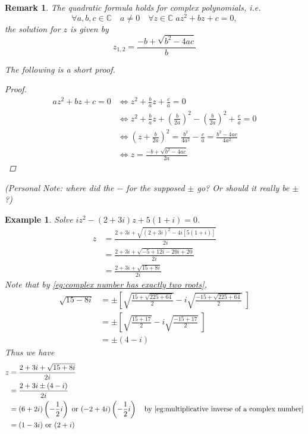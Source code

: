 \documentclass[11pt, oneside]{book}
\theoremstyle{break}
\newtheorem*{proof}{Proof}
\newtheorem*{remark}{Remark}
\newtheorem{eg}{Example}[section]
\begin{document}
\begin{remark}\label{remark:quadratic formula for complex numbers}
	The quadratic formula holds for complex polynomials, i.e.
	\begin{equation*}
		\forall a, b, c \in \mathbb{C} \quad a \neq 0 \quad \forall z \in \mathbb{C} \; az^2 + bz + c = 0,
	\end{equation*}
	the solution for $z$ is given by
	\begin{equation}\label{eq:quadractic formula for complex numbers}
		z_{1, 2} = \frac{-b + \sqrt{b^2 - 4ac}}{b} 
	\end{equation}

	The following is a short proof.

	\begin{proof}
		\begin{align*}
			az^2 + bz + c = 0 &\iff z^2 + \frac{b}{a} z + \frac{c}{a} = 0 \\
				&\iff z^2 + \frac{b}{a} z + \left(\frac{b}{2a} \right)^2 - \left(\frac{b}{2a}\right)^2 + \frac{c}{a} = 0 \\
				&\iff \left(z + \frac{b}{2a} \right)^2 = \frac{b^2}{4a^2} - \frac{c}{a} = \frac{b^2 - 4ac}{4a^2} \\
				&\iff z = \frac{-b + \sqrt{b^2 - 4ac}}{2a}  
		\end{align*}
	\end{proof}

	(Personal Note: where did the $-$ for the supposed $\pm$ go? Or should it really be $\pm$?)
\end{remark}

\begin{eg}
	Solve $iz^2 - (2 + 3i)z + 5(1 + i) = 0$.
	\begin{align*}
		z &= \frac{2 + 3i + \sqrt{(2 + 3i)^2 - 4i[5(1 + i)]}}{2i} \\
			&= \frac{2 + 3i + \sqrt{-5 + 12i -20i + 20}}{2i} \\
			&= \frac{2 + 3i + \sqrt{15 + 8i}}{2i} 
	\end{align*}
	Note that by \cref{eg:complex number has exactly two roots},
	\begin{align*}
		\sqrt{15 - 8i} &= \pm \left[ \sqrt{\frac{15 + \sqrt{225 + 64}}{2} } - i \sqrt{\frac{-15 + \sqrt{225 + 64}}{2} } \; \right] \\
			&= \pm \left[ \sqrt{\frac{15 + 17}{2} } - i \sqrt{\frac{-15 + 17}{2} } \; \right] \\
			&= \pm (4 - i)
	\end{align*}
	Thus we have
	\begin{align*}
		z &= \frac{2 + 3i + \sqrt{15 + 8i}}{2i} \\
			&= \frac{2 + 3i \pm (4 - i)}{2i} \\
			&= (6 + 2i) \left( -\frac{1}{2}i \right) \text{ or } (-2 + 4i) \left( -\frac{1}{2} i \right) \quad \text{by } \cref{eg:multiplicative inverse of a complex number} \\
			&= (1 - 3i) \text{ or } (2 + i)
	\end{align*}
\end{eg}
\end{document}
